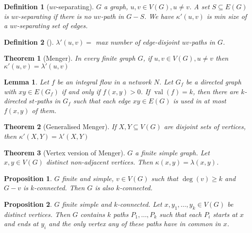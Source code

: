 \documentclass{article}
\newcommand{\st}{such that }
\DeclareMathOperator*{\val}{val}
\newtheorem*{definition}{Definition}
\newtheorem*{proposition}{Proposition}
\newtheorem*{lemma}{Lemma}
\newtheorem*{theorem}{Theorem}
\begin{document}
\begin{definition}[$uv$-separating]
    $ G $ a graph, $ u,v \in V(G), u \neq v $. A set $ S \subseteq E(G) $ is $ uv $-separating if there is no $ uv $-path in $ G - S $.
    We have $ \kappa'(u,v) $ is min size of a $ uv $-separating set of edges.
\end{definition}

\begin{definition}[]
    $ \lambda'(u,v) = $ max number of edge-disjoint $ uv $-paths in $ G $.
\end{definition}

\begin{theorem}[Menger]
    In every finite graph $ G $, if $ u,v \in V(G), u\neq v $ then $ \kappa'(u,v) = \lambda'(u,v) $
\end{theorem}

\begin{lemma}
    Let $ f $ be an integral flow in a network $ N $. Let $ G_f $ be a directed graph with $ xy \in E(G_f) $ if and only if $ f(x,y) > 0 $.
    If $ \val(f) = k $, then there are $ k $-directed $ st $-paths in $ G_f $ \st each edge $ xy \in E(G) $ is used in at most
    $ f(x,y) $ of them.
\end{lemma}

\begin{theorem}[Generalised Menger]
    If $ X,Y \subseteq V(G) $ are disjoint sets of vertices, then $ \kappa'(X,Y) = \lambda'(X,Y) $
\end{theorem}

\begin{theorem}[Vertex version of Menger]
    $ G $ a finite simple graph. Let $ x,y \in V(G) $ distinct non-adjacent vertices. Then $ \kappa(x,y) = \lambda(x,y) $.
\end{theorem}

\begin{proposition}
    $ G $ finite and simple, $ v \in V(G) $ \st $ \deg(v) \geq k $ and $ G - v $ is $ k $-connected. Then $ G $ is also $ k $-connected.
\end{proposition}

\begin{proposition}
    $ G $ finite simple and $ k $-connected. Let $ x, y_1, \dots, y_k \in V(G) $ be distinct vertices. Then $ G $ contains $ k $ paths
    $ P_1, \dots, P_k $ \st each $ P_i $ starts at $ x $ and ends at $ y_i $ and the only vertex any of these paths have in common in $ x $.
\end{proposition}
\end{document}
